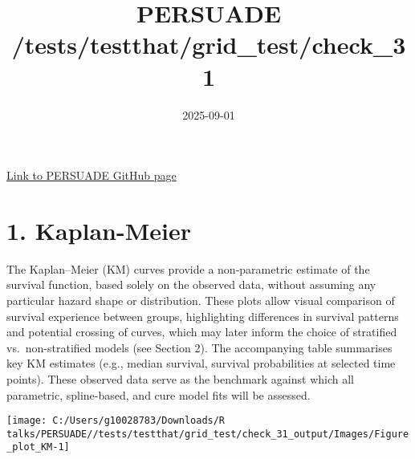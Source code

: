 \documentclass[
]{article}
\title{PERSUADE /tests/testthat/grid\_test/check\_31}
\author{}
\date{\vspace{-2.5em}2025-09-01}
\begin{document}
\maketitle

{
\hypersetup{linkcolor=}
\setcounter{tocdepth}{2}
\tableofcontents
}
\hfill\break

\href{https://github.com/Bram-R/PERSUADE}{Link to PERSUADE GitHub page}

\clearpage

\section{1. Kaplan-Meier}\label{kaplan-meier}

The Kaplan--Meier (KM) curves provide a non-parametric estimate of the
survival function, based solely on the observed data, without assuming
any particular hazard shape or distribution. These plots allow visual
comparison of survival experience between groups, highlighting
differences in survival patterns and potential crossing of curves, which
may later inform the choice of stratified vs.~non-stratified models (see
Section 2). The accompanying table summarises key KM estimates (e.g.,
median survival, survival probabilities at selected time points). These
observed data serve as the benchmark against which all parametric,
spline-based, and cure model fits will be assessed.

\clearpage

\begin{flushleft}\texttt{[image: C:/Users/g10028783/Downloads/R talks/PERSUADE//tests/testthat/grid\_test/check\_31\_output/Images/Figure\_plot\_KM-1]} \end{flushleft}

\begin{table}[H]
\centering
\caption{\label{tab:Table_1}Observed survival data}
\centering
{}
\end{table}
\end{document}
